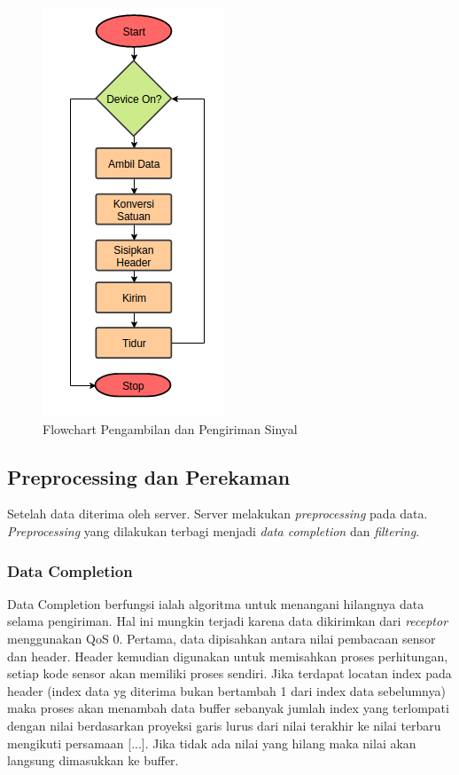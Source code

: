 \begin{figure}[H]
\centering
\includegraphics[scale=0.8]{images/flow_sample.png}
\caption{Flowchart Pengambilan dan Pengiriman Sinyal}
\label{flow_sample}
\end{figure}

\subsection{Preprocessing dan Perekaman}
Setelah data diterima oleh server. Server melakukan \textit{preprocessing} pada data. \textit{Preprocessing} yang dilakukan terbagi menjadi \textit{data completion} dan \textit{filtering}.

\subsubsection{Data Completion}
Data Completion berfungsi ialah algoritma untuk menangani hilangnya data selama pengiriman. Hal ini mungkin terjadi karena data dikirimkan dari \textit{receptor} menggunakan QoS 0. Pertama, data dipisahkan antara nilai pembacaan sensor dan header. Header kemudian digunakan untuk memisahkan proses perhitungan, setiap kode sensor akan memiliki proses sendiri. Jika terdapat locatan index pada header (index data yg diterima bukan bertambah 1 dari index data sebelumnya) maka proses akan menambah data buffer sebanyak jumlah index yang terlompati dengan nilai berdasarkan proyeksi garis lurus dari nilai terakhir ke nilai terbaru mengikuti persamaan [...]. Jika tidak ada nilai yang hilang maka nilai akan langsung dimasukkan ke buffer.

